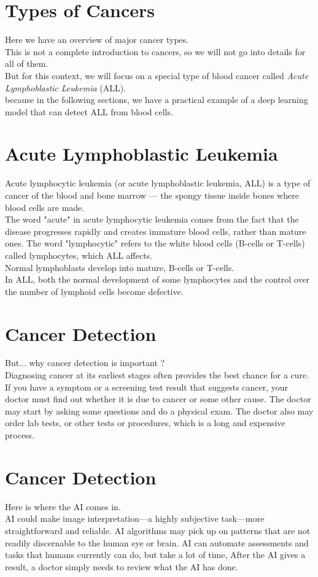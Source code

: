 \documentclass{SBCbookchapter}
\begin{document}
\section*{Types of Cancers}
Here we have an overview of major cancer types. \\
This is not a complete introduction to cancers, 
so we will not go into details for all of them. \\
But for this context, we will focus on a special type of blood cancer
called \textit{Acute Lymphoblastic Leukemia} (ALL). \\
because in the following sections, we have a practical example
of a deep learning model that can detect ALL from blood cells.

\section*{Acute Lymphoblastic Leukemia}
Acute lymphocytic leukemia (or acute lymphoblastic leukemia, ALL)
is a type of cancer of the blood and bone marrow — 
the spongy tissue inside bones where blood cells are made. \\
The word "acute" in acute lymphocytic leukemia comes
from the fact that the disease progresses rapidly and
creates immature blood cells, rather than mature ones.
The word "lymphocytic" 
refers to the white blood cells (B-cells or T-cells) called lymphocytes, 
which ALL affects. \\
Normal lymphoblasts develop into mature, B-cells or T-cells.\\
In ALL, both the normal development of some 
lymphocytes and the control over the number of 
lymphoid cells become defective.

\section*{Cancer Detection}
But... why cancer detection is important ? \\
Diagnosing cancer at its earliest stages often provides the
best chance for a cure. \\
If you have a symptom or a screening test result that suggests cancer,
your doctor must find out whether it is due to cancer or some other
cause.
The doctor may start by asking some questions and do a physical exam. 
The doctor also may order lab tests, or other tests or procedures,
which is a long and expensive process.

\section*{Cancer Detection}
Here is where the AI comes in. \\
AI could make image interpretation—a highly subjective task—more
straightforward and reliable.
AI algorithms may pick up on patterns that are not readily
discernable to the human eye or brain.
AI can automate assessments and tasks that humans currently can
do, but take a lot of time, After the AI gives a result, a doctor simply
needs to review what the AI has done.
\end{document}
